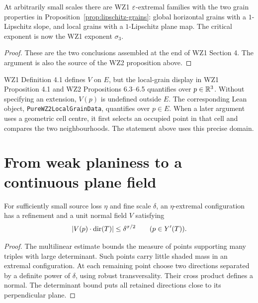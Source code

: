 \begin{proposition}
\label{prop:wz1-grains}
At arbitrarily small scales there are WZ1 $\varepsilon$-extremal families
with the two grain properties in Proposition~\ref{prop:lipschitz-grains}:
global horizontal grains with a $1$-Lipschitz slope, and local grains
with a $1$-Lipschitz plane map. The critical exponent is now the WZ1
exponent $\sigma_3$.
\end{proposition}
\begin{proof}
These are the two conclusions assembled at the end of WZ1 Section 4.
The argument is also the source of the WZ2 proposition above.
\end{proof}

\begin{remark}
\label{rem:plane-domain}
WZ1 Definition 4.1 defines $V$ on $E$, but the local-grain display in
WZ1 Proposition 4.1 and WZ2 Propositions 6.3--6.5 quantifies over
$p\in\mathbb{R}^3$. Without specifying an extension, $V(p)$ is undefined
outside $E$. The corresponding Lean object,
\texttt{PureWZ2LocalGrainData}, quantifies over $p\in E$. When a later
argument uses a geometric cell centre, it first selects an occupied
point in that cell and compares the two neighbourhoods. The statement
above uses this precise domain.
\end{remark}

\section{From weak planiness to a continuous plane field}

\begin{lemma}
\label{lem:weak-plane-map}
For sufficiently small source loss $\eta$ and fine scale $\delta$,
an $\eta$-extremal configuration has a refinement and a unit normal
field $V$ satisfying
\[
       |V(p)\cdot\operatorname{dir}(T)|\leq\delta^{\sigma/2}
       \qquad(p\in Y'(T)).
\]
\end{lemma}
\begin{proof}
The multilinear estimate bounds the measure of points supporting many
triples with large determinant. Such points carry little shaded mass
in an extremal configuration. At each remaining point choose two
directions separated by a definite power of $\delta$, using robust
transversality. Their cross product defines a normal. The determinant
bound puts all retained directions close to its perpendicular plane.
\end{proof}

